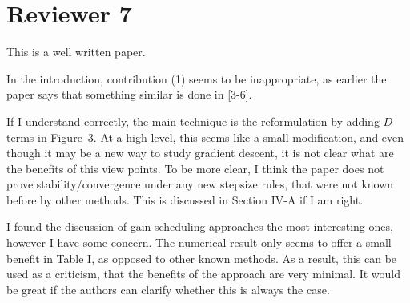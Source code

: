 \section*{Reviewer 7}\label{sec:reviewer7}
\renewcommand{\theequation}{R7.\arabic{equation}}
\setcounter{equation}{0}
\begin{rebuttal}[resovled]
    {%
        This is a well written paper.
    }%
    {%
    }%
\end{rebuttal}
\begin{rebuttal}[resovled]
    {%
        In the introduction, contribution (1) seems to be inappropriate, as earlier the paper says that something similar is done in [3-6].
    }%
    {%
    }%
\end{rebuttal}
\begin{rebuttal}[pending]
    {%
        If I understand correctly, the main technique is the reformulation by adding $D$ terms in Figure~3. At a high level, this seems like a small modification, and even though it may be a new way to study gradient descent, it is not clear what are the benefits of this view points. To be more clear, I think the paper does not prove stability/convergence under any new stepsize rules, that were not known before by other methods. This is discussed in Section IV-A if I am right.
    }%
    {%
    }%
\end{rebuttal}
\begin{rebuttal}[pending]
    {%
        I found the discussion of gain scheduling approaches the most interesting ones, however I have some concern. The numerical result only seems to offer a small benefit in Table I, as opposed to other known methods. As a result, this can be used as a criticism, that the benefits of the approach are very minimal. It would be great if the authors can clarify whether this is always the case.
    }%
    {%
    }%
\end{rebuttal}
